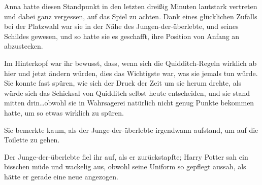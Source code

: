 Anna hatte diesen Standpunkt in den letzten dreißig Minuten lautstark vertreten und dabei ganz vergessen, auf das Spiel zu achten. Dank eines glücklichen Zufalls bei der Platzwahl war sie in der Nähe des Jungen-der-überlebte, und seines Schildes gewesen, und so hatte sie es geschafft, ihre Position von Anfang an abzustecken.

Im Hinterkopf war ihr bewusst, dass, wenn sich die Quidditch-Regeln wirklich ab hier und jetzt ändern würden, dies das Wichtigste war, was sie jemals tun würde. Sie konnte fast spüren, wie sich der Druck der Zeit um sie herum drehte, als würde sich das Schicksal von Quidditch selbst heute entscheiden, und sie stand mitten drin…obwohl sie in Wahrsagerei natürlich nicht genug Punkte bekommen hatte, um so etwas wirklich zu spüren.

Sie bemerkte kaum, als der Junge-der-überlebte irgendwann aufstand, um auf die Toilette zu gehen.

Der Junge-der-überlebte fiel ihr auf, als er zurückstapfte; Harry Potter sah ein bisschen müde und wackelig aus, obwohl seine Uniform so gepflegt aussah, als hätte er gerade eine neue angezogen.

